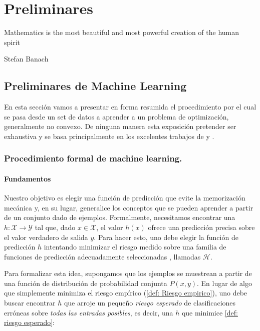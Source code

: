\chapter{Preliminares}\label{ch:preliminares}

\epigraph{Mathematics is the most beautiful and most powerful creation of the human spirit}{Stefan Banach}

\section{Preliminares de Machine Learning}

En esta secci\'on vamos a presentar en forma resumida el procedimiento por el cual se pasa desde un set de datos a aprender a un problema de optimizaci\'on, generalmente no convexo. De ninguna manera esta exposici\'on pretender ser exhaustiva y se basa principalmente en los excelentes trabajos de \cite{bottou:2016} y \cite{mohri:2012}.

\subsection{Procedimiento formal de machine learning.}

\subsubsection{Fundamentos} 
Nuestro objetivo es elegir una funci\'on de predicci\'on que evite la memorizaci\'on mec\'anica y, en su lugar, generalice los conceptos que se pueden aprender a partir de un conjunto dado de ejemplos. Formalmente, necesitamos encontrar una $h:\mathcal{X} \rightarrow \mathcal{Y}$ tal que, dado $x \in \mathcal{X}$, el valor $h (x)$ ofrece una predicci\'on precisa sobre el valor verdadero de salida $y$. Para hacer esto, uno debe elegir la funci\'on de predicci\'on $h$ intentando minimizar el riesgo medido sobre una familia de funciones de predicci\'on adecuadamente seleccionadas \cite{vapnik:1971}, llamadas $\mathcal{H}$.

Para formalizar esta idea, supongamos que los ejemplos se muestrean a partir de una funci\'on de distribuci\'on de probabilidad conjunta $P (x, y)$. En lugar de algo que simplemente minimiza el riesgo emp\'irico (\ref{def: Riesgo empirico}), uno debe buscar encontrar $h$ que arroje un peque\~no \textit{riesgo esperado} de clasificaciones err\'oneas sobre \textit{todas las entradas posibles}, es decir, una $h$ que minimice \ref{def: riesgo esperado}:

